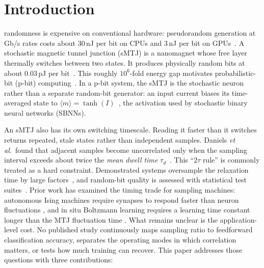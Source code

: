 \documentclass[journal]{IEEEtran}
\begin{document}
\section{Introduction}
 randomness is expensive on conventional
hardware: pseudorandom generation at Gb/s rates costs about 30\,nJ per bit
on CPUs and 3\,nJ per bit on GPUs~\cite{sun2026superparamagnetic}. A
stochastic magnetic tunnel junction (sMTJ) is a nanomagnet whose free layer
thermally switches between two states. It produces physically random bits at
about 0.03\,pJ per bit~\cite{sun2026superparamagnetic}. This roughly
$10^6$-fold energy gap motivates probabilistic-bit (p-bit)
computing~\cite{camsari2017stochastic,kaiser2021probabilistic}. In a p-bit
system, the sMTJ is the stochastic neuron rather than a separate random-bit
generator: an input current biases its time-averaged state to
$\langle m \rangle = \tanh(I)$~\cite{camsari2017stochastic}, the activation
used by stochastic binary neural networks (SBNNs).

An sMTJ also has its own switching timescale. Reading it faster than it
switches returns repeated, stale states rather than independent samples.
Daniels \emph{et al.}\ found that adjacent samples become uncorrelated only
when the sampling interval exceeds about twice the \emph{mean dwell time}
$\tau_d$~\cite{daniels2020energy}. This ``$2\tau$ rule'' is commonly treated
as a hard constraint. Demonstrated systems oversample the relaxation time by
large factors~\cite{singh2024cmos}, and random-bit quality is assessed with
statistical test suites~\cite{vodenicarevic2017low,sun2026superparamagnetic}.
Prior work has examined the timing trade for sampling machines: autonomous
Ising machines require synapses to respond faster than neuron fluctuations
\cite{sutton2020autonomous}, and in situ Boltzmann learning requires a
learning time constant longer than the MTJ fluctuation time
\cite{kaiser2022hardware}. What remains unclear is the application-level
cost. No published study continuously maps sampling ratio to feedforward
classification accuracy, separates the operating modes in which correlation
matters, or tests how much training can recover. This paper addresses those
questions with three contributions:
\end{document}
